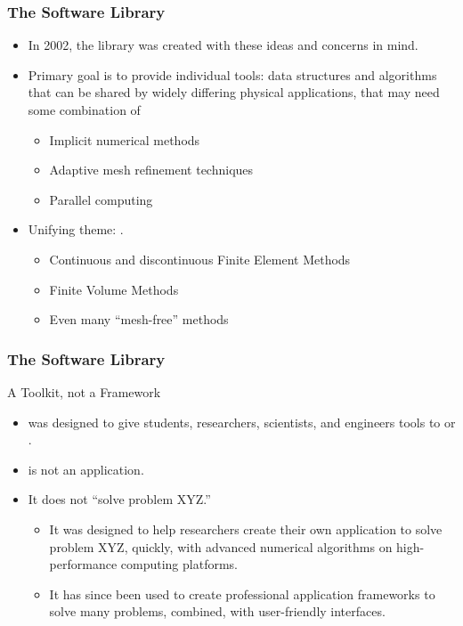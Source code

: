 \frame
{
  \frametitle{The \libMesh{} Software Library}
  \begin{itemize}
    \item In 2002, the \libMesh{} library was created with these ideas
      and concerns in mind.
    \item Primary goal is to provide individual tools: data structures
      and algorithms that can be shared by widely differing physical
      applications, that may need some combination of
      \begin{itemize}
      \item Implicit numerical methods
      \item Adaptive mesh refinement techniques
      \item Parallel computing 
      \end{itemize}
    \item Unifying theme: .
      \begin{itemize}
      \item Continuous and discontinuous Finite Element Methods
      \item Finite Volume Methods
      \item Even many ``mesh-free'' methods
      \end{itemize}
  \end{itemize}
}




 

\frame
{
  \frametitle{The \libMesh{} Software Library}

  \begin{block}{A Toolkit, not a Framework}
    \begin{itemize}
      \item \libMesh{} was designed to give students, researchers,
        scientists, and engineers tools to  or .
      \item \libMesh{} is not an application.
      \item It does not ``solve problem XYZ.''
        \begin{itemize}
          \item It was designed to help  researchers
            create their own application to solve problem XYZ,
            quickly, with advanced numerical algorithms on
            high-performance computing platforms.
          \item It has since been used to create professional
            application frameworks to solve many problems, combined,
            with user-friendly interfaces.
        \end{itemize}
    \end{itemize}    
  \end{block}
} 


